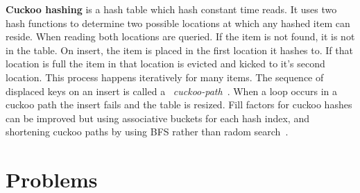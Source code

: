 \textbf{Cuckoo hashing} is a hash table which hash constant
time reads. It uses two hash functions to determine two
possible locations at which any hashed item can reside. When
reading both locations are queried. If the item is not
found, it is not in the table. On insert, the item is placed
in the first location it hashes to. If that location is full
the item in that location is evicted and kicked to it's
second location.  This process happens iteratively for many
items. The sequence of displaced keys on an insert is called
a ~\textit{cuckoo-path}~\cite{cuckoo-improvements}. When a
loop occurs in a cuckoo path the insert fails and the table
is resized. Fill factors for cuckoo hashes can be improved
but using associative buckets for each hash index, and
shortening cuckoo paths by using BFS rather than radom
search~\cite{cuckoo-improvements}.

\section{Problems}
\label{sec:problems}

